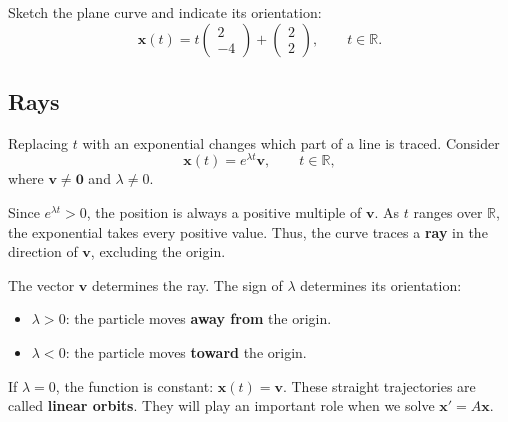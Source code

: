 \documentclass[11pt,letterpaper]{article}
\begin{document}
\begin{example}[3]{
Sketch the plane curve and indicate its orientation:
\[
\mathbf{x}(t)=
t\begin{pmatrix}2\\-4\end{pmatrix}
+\begin{pmatrix}2\\2\end{pmatrix},
\qquad t\in\mathbb R.
\]
}
\begin{center}
\end{center}
\end{example}
\subsection{Rays}

Replacing $t$ with an exponential changes which part
of a line is traced. Consider
\[
\mathbf{x}(t)=e^{\lambda t}\mathbf{v},
\qquad t\in\mathbb R,
\]
where $\mathbf{v}\ne\mathbf{0}$ and $\lambda\ne0$.

Since $e^{\lambda t}>0$, the position is always a
positive multiple of $\mathbf{v}$. As $t$ ranges over
$\mathbb R$, the exponential takes every positive value.
Thus, the curve traces a \textbf{ray} in the direction
of $\mathbf{v}$, excluding the origin.

The vector $\mathbf{v}$ determines the ray.
The sign of $\lambda$ determines its orientation:
\begin{itemize}
    \item $\lambda>0$: the particle moves
    \textbf{away from} the origin.
    \item $\lambda<0$: the particle moves
    \textbf{toward} the origin.
\end{itemize}
If $\lambda=0$, the function is constant:
$\mathbf{x}(t)=\mathbf{v}$. These straight trajectories are called
\textbf{linear orbits}. They will play an important
role when we solve $\mathbf{x}'=A\mathbf{x}$.
\end{document}
